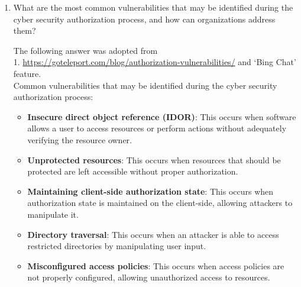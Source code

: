 \documentclass[11pt,letterpaper]{article}
\newenvironment{answer}{\em \color{blue} \begin{adjustwidth}{1cm}{1cm}}{\end{adjustwidth}}
\begin{document}
\begin{enumerate}
\begin{answer}
\begin{itemize}
				\item \textbf{Operational requirements} - The chosen framework should provide guidelines on how to implement and manage information security controls in a way that it supports the organization's day-to-day operations.
				
				\item \textbf{Complexity and scale} - Various frameworks support varying degree of complexity and scale. The framework must be selected in a way that it matches the complexity and scale of the organization needs and functionalities.
			\end{itemize}
		\end{answer}
		
		\item What are the most common vulnerabilities that may be identified during the cyber security authorization process, and how can organizations address them?
		
		\begin{answer}
			
			The following answer was adopted from
			\\ 1. \url{https://goteleport.com/blog/authorization-vulnerabilities/} and `Bing Chat' feature.\\ 
			
			Common vulnerabilities that may be identified during the cyber security authorization process:
			\begin{itemize}
				\item \textbf{Insecure direct object reference (IDOR)}: This occurs when software allows a user to access resources or perform actions without adequately verifying the resource owner.
				
				\item \textbf{Unprotected resources}: This occurs when resources that should be protected are left accessible without proper authorization.
				
				\item \textbf{Maintaining client-side authorization state}: This occurs when authorization state is maintained on the client-side, allowing attackers to manipulate it.
				
				\item \textbf{Directory traversal}: This occurs when an attacker is able to access restricted directories by manipulating user input.
				
				\item \textbf{Misconfigured access policies}: This occurs when access policies are not properly configured, allowing unauthorized access to resources. 
				

\end{itemize}
\end{answer}
\end{enumerate}
\end{document}

